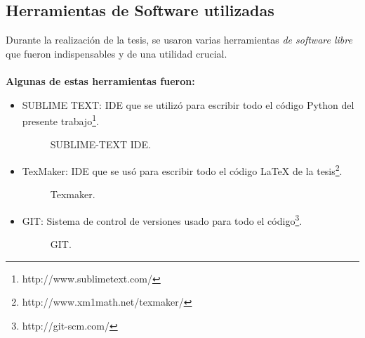 	\subsection{Herramientas de Software utilizadas}
	    Durante la realización de la tesis, se usaron varias herramientas \textit{de software libre} que fueron indispensables y de una utilidad crucial. \\
	    \\
	   \textbf{ Algunas de estas herramientas fueron:}
	   \begin{itemize}

	       \item SUBLIME TEXT: IDE que se utilizó para escribir todo el código Python del presente trabajo\footnote{http://www.sublimetext.com/}.
					\begin{figure}[htbp]
						\centering
						\caption{SUBLIME-TEXT IDE.}
						\label{fig:sublime_ide}
					\end{figure}

	       \item TexMaker: IDE que se usó para escribir todo el código \LaTeX{} de la tesis\footnote{http://www.xm1math.net/texmaker/}.
					\begin{figure}[htbp]
						\centering
						\caption{Texmaker.}
						\label{fig:texmaker}
					\end{figure}

	       \item GIT: Sistema de control de versiones usado para todo el código\footnote{http://git-scm.com/}.
					\begin{figure}[htbp]
						\centering
						\caption{GIT.}
						\label{fig:git}
					\end{figure}
	   \end{itemize}
	
	
	
	